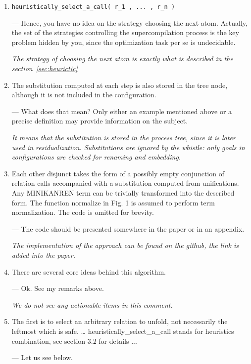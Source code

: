\begin{enumerate}
  \item{\verb!heuristically_select_a_call( r_1 , ... , r_n )!

  --- Hence, you have no idea on the strategy choosing the next atom. Actually, the set of the strategies controlling the supercompilation process is the key problem hidden by you, since the optimization task per se is undecidable.

  \emph{The strategy of choosing the next atom is exactly what is described in the section~\ref{sec:heurictic}}
  }

  \item{
    The substitution computed at each step is also stored in the tree node, although it is not included in the configuration.

    --- What does that mean? Only either an example mentioned above or a precise definition may provide information on the subject.

    \emph{It means that the substitution is stored in the process tree, since it is later used in residualization. Substitutions are ignored by the whistle: only goals in configurations are checked for renaming and embedding.}
  }

  \item{
    Each other disjunct takes the form of a possibly empty conjunction of relation calls accompanied with a substitution computed from unifications. Any MINIKANREN term can be trivially transformed into the described form. The function normalize in Fig. 1 is assumed to perform term normalization. The code is omitted for brevity.

    --- The code should be presented somewhere in the paper or in an appendix.

    \emph{The implementation of the approach can be found on the github, the link is added into the paper.}
  }

  \item{
    There are several core ideas behind this algorithm.

    --- Ok. See my remarks above.

    \emph{We do not see any actionable items in this comment.}
  }

  \item{
    The first is to select an arbitrary relation to unfold, not necessarily the leftmost which is safe. … heuristically_select_a_call stands for heuristics combination, see section 3.2 for details ...

    --- Let us see below.

}
\end{enumerate}
